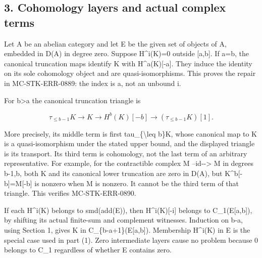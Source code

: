 \documentclass[11pt]{article}
\begin{document}
\subsection{3. Cohomology layers and actual complex terms}\label{proofs-10691-11108-cohomology-layers-and-actual-complex-terms}

Let A be an abelian category and let E be the given set of objects of A,\allowbreak{} embedded in D(A)\allowbreak{} in degree zero. Suppose H\textasciicircum{}i(K)\allowbreak{}\allowbreak{}=0 outside [a,\allowbreak{}b]\allowbreak{}. If a\allowbreak{}=b,\allowbreak{} the canonical truncation maps identify K with H\textasciicircum{}a(K)\allowbreak{}[-a]\allowbreak{}. They induce the identity on its sole cohomology object and are quasi-isomorphisms. This proves the repair in MC-STK-ERR-0889:\allowbreak{} the index is a,\allowbreak{} not an unbound i.

For b\textgreater a the canonical truncation triangle is

\[
 \tau_{\leq b-1}K\longrightarrow K\longrightarrow H^b(K)[-b]
                 \longrightarrow(\tau_{\leq b-1}K)[1].
\]

More precisely,\allowbreak{} its middle term is first tau\_\allowbreak{}\{\textbackslash{}leq b\}K,\allowbreak{} whose canonical map to K is a quasi-isomorphism under the stated upper bound,\allowbreak{} and the displayed triangle is its transport. Its third term is cohomology,\allowbreak{} not the last term of an arbitrary representative. For example,\allowbreak{} for the contractible complex M --id-\allowbreak{}-> M in degrees b-1,\allowbreak{}b,\allowbreak{} both K and its canonical lower truncation are zero in D(A)\allowbreak{},\allowbreak{} but K\textasciicircum{}b[-b]\allowbreak{}\allowbreak{}=M[-b]\allowbreak{} is nonzero when M is nonzero. It cannot be the third term of that triangle. This verifies MC-STK-ERR-0890.

If each H\textasciicircum{}i(K)\allowbreak{} belongs to smd(add(E)\allowbreak{})\allowbreak{},\allowbreak{} then H\textasciicircum{}i(K)\allowbreak{}[-i]\allowbreak{} belongs to C\_\allowbreak{}1(E[a,\allowbreak{}b]\allowbreak{})\allowbreak{},\allowbreak{} by shifting its actual finite-sum and complement witnesses. Induction on b-a,\allowbreak{} using Section 1,\allowbreak{} gives K in C\_\allowbreak{}\{b-a\allowbreak{}+1\}(E[a,\allowbreak{}b]\allowbreak{})\allowbreak{}. Membership H\textasciicircum{}i(K)\allowbreak{} in E is the special case used in part (1)\allowbreak{}. Zero intermediate layers cause no problem because 0 belongs to C\_\allowbreak{}1 regardless of whether E contains zero.
\end{document}
